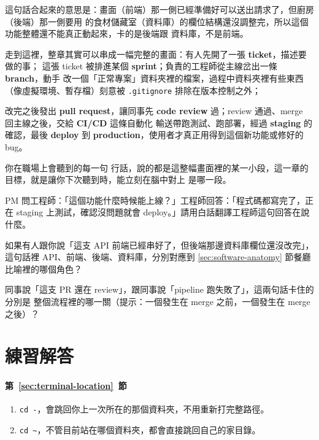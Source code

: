 這句話合起來的意思是：畫面（前端）那一側已經準備好可以送出請求了，但廚房（後端）那一側要用
的食材儲藏室（資料庫）的欄位結構還沒調整完，所以這個功能整體還不能真正動起來，卡的是後端跟
資料庫，不是前端。

走到這裡，整章其實可以串成一幅完整的畫面：有人先開了一張 \textbf{ticket}，描述要做的事；
這張 ticket 被排進某個 \textbf{sprint}；負責的工程師從主線岔出一條 \textbf{branch}，動手
改一個「正常專案」資料夾裡的檔案，過程中資料夾裡有些東西（像虛擬環境、暫存檔）刻意被
\texttt{.gitignore} 排除在版本控制之外；

改完之後發出 \textbf{pull request}，讓同事先
\textbf{code review} 過；review 通過、merge 回主線之後，交給 \textbf{CI/CD} 這條自動化
輸送帶跑測試、跑部署，經過 \textbf{staging} 的確認，最後 \textbf{deploy} 到
\textbf{production}，使用者才真正用得到這個新功能或修好的 bug。

你在職場上會聽到的每一句
行話，說的都是這整幅畫面裡的某一小段，這一章的目標，就是讓你下次聽到時，能立刻在腦中對上
是哪一段。

\begin{drills}[label=drills:workplace-scenarios]
\item PM 問工程師：「這個功能什麼時候能上線？」工程師回答：「程式碼都寫完了，正在 staging
上測試，確認沒問題就會 deploy。」請用白話翻譯工程師這句回答在說什麼。
\item 如果有人跟你說「這支 API 前端已經串好了，但後端那邊資料庫欄位還沒改完」，這句話裡
API、前端、後端、資料庫，分別對應到 \ref{sec:software-anatomy} 節餐廳比喻裡的哪個角色？
\item 同事說「這支 PR 還在 review」，跟同事說「pipeline 跑失敗了」，這兩句話卡住的分別是
整個流程裡的哪一關（提示：一個發生在 merge 之前，一個發生在 merge 之後）？
\end{drills}

\section*{練習解答}

\paragraph{第~\ref{sec:terminal-location}~節}
\begin{enumerate}
\item \texttt{cd -}，會跳回你上一次所在的那個資料夾，不用重新打完整路徑。
\item \texttt{cd \textasciitilde}，不管目前站在哪個資料夾，都會直接跳回自己的家目錄。
\end{enumerate}

